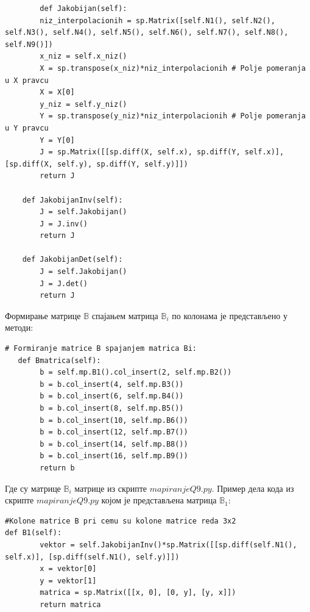 \documentclass[11pt, a4paper]{article}
\begin{document}
\begin{lstlisting}
        def Jakobijan(self):
        niz_interpolacionih = sp.Matrix([self.N1(), self.N2(), self.N3(), self.N4(), self.N5(), self.N6(), self.N7(), self.N8(), self.N9()])
        x_niz = self.x_niz()
        X = sp.transpose(x_niz)*niz_interpolacionih # Polje pomeranja u X pravcu
        X = X[0]
        y_niz = self.y_niz()
        Y = sp.transpose(y_niz)*niz_interpolacionih # Polje pomeranja u Y pravcu
        Y = Y[0]
        J = sp.Matrix([[sp.diff(X, self.x), sp.diff(Y, self.x)], [sp.diff(X, self.y), sp.diff(Y, self.y)]])
        return J
    
    def JakobijanInv(self):
        J = self.Jakobijan()
        J = J.inv()
        return J

    def JakobijanDet(self):
        J = self.Jakobijan()
        J = J.det()
        return J
\end{lstlisting}

Формирање матрице $\mathbb{B}$ спајањем матрица $\mathbb{B}_i$ по колонама је представљено у методи:
\begin{lstlisting}
# Formiranje matrice B spajanjem matrica Bi:
   def Bmatrica(self):
        b = self.mp.B1().col_insert(2, self.mp.B2())
        b = b.col_insert(4, self.mp.B3())
        b = b.col_insert(6, self.mp.B4())
        b = b.col_insert(8, self.mp.B5())
        b = b.col_insert(10, self.mp.B6())
        b = b.col_insert(12, self.mp.B7())
        b = b.col_insert(14, self.mp.B8())
        b = b.col_insert(16, self.mp.B9())
        return b
\end{lstlisting}
Где су матрице $\mathbb{B}_i$ матрице из скрипте $mapiranjeQ9.py$. Пример дела кода из скрипте $mapiranjeQ9.py$ којом је представљена матрица $\mathbb{B}_1$:

\begin{lstlisting}
#Kolone matrice B pri cemu su kolone matrice reda 3x2
def B1(self):
        vektor = self.JakobijanInv()*sp.Matrix([[sp.diff(self.N1(), self.x)], [sp.diff(self.N1(), self.y)]])
        x = vektor[0]
        y = vektor[1]
        matrica = sp.Matrix([[x, 0], [0, y], [y, x]])
        return matrica
\end{lstlisting}
\end{document}
